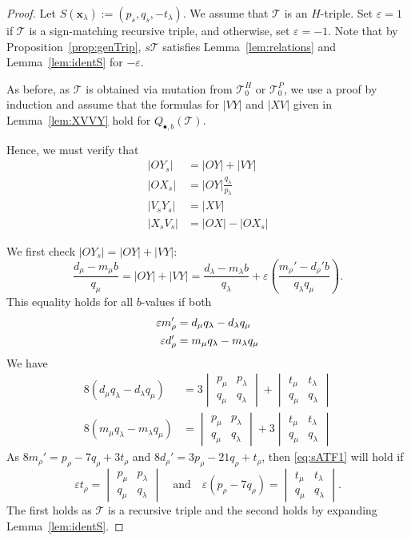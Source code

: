 \documentclass[11pt, reqno]{amsart}
\theoremstyle{remark}
\numberwithin{equation}{subsection}
\numberwithin{figure}{section}
\theoremstyle{customremark}
\newcommand{\Tt}{\mathcal{T}}
\newcommand{\la}{{\lambda}}
\newcommand{\eps}{\varepsilon}
\begin{document}
\begin{proof}
    Let $S(\bm{x}_\la):=(p_s,q_s,-t_\la).$
    We assume that $\Tt$ is an $H$-triple. 
Set $\eps=1$ if $\Tt$ is a sign-matching recursive triple, and  otherwise, set $\eps=-1.$ Note that by Proposition~\ref{prop:genTrip}, $s\Tt$ satisfies Lemma~\ref{lem:relations} and Lemma~\ref{lem:identS} for $-\eps.$

As before, as $\Tt$ is obtained via mutation from $\Tt_0^H$ or $\Tt_0^P$, we use a proof by induction and assume that the formulas for $|VY|$ and $|XV|$ given in Lemma~\ref{lem:XVVY} hold for $Q_{\bullet,b}(\Tt).$ 

Hence, we must verify that 
\begin{align*} 
      |OY_s|&=|OY|+|VY| \\
    |OX_s|&=|OY|\frac{q_\la}{p_\la} \\
     |V_sY_s|&=|XV| \\
     |X_sV_s|&=|OX|-|OX_s|
\end{align*}
    
    We first check $|OY_s|=|OY|+|VY|:$
    \[\frac{d_\mu-m_\mu b}{q_\mu}=|OY|+|VY|=\frac{d_\la-m_\la b}{q_\la}+\eps\left(\frac{m_\rho'-d_\rho' b}{q_\la q_\mu}\right).\] This equality holds for all $b$-values if 
    both 
     \begin{align} \label{eq:sATF1}
        \eps m_\rho'&=d_\mu q_\la-d_\la q_\mu  \notag \\
        \eps d_\rho'&=m_\mu q_\la-m_\la q_\mu
    \end{align}
    We have
    \begin{align*} 8(d_\mu q_\la -d_\la q_\mu)&= 3\begin{vmatrix}  p_\mu & p_\la \\ q_\mu & q_\la \end{vmatrix}+\begin{vmatrix} 
 t_\mu &  t_\la
\\ q_\mu & q_\la
    \end{vmatrix} \\
    8(m_\mu q_\la -m_\la q_\mu)&= \begin{vmatrix}  p_\mu & p_\la \\ q_\mu & q_\la \end{vmatrix}+3\begin{vmatrix} 
 t_\mu & t_\la
\\ q_\mu & q_\la
    \end{vmatrix}
    \end{align*}
    As $8m_\rho'=p_\rho-7q_\rho+3 t_\rho$ and 
    $8d_\rho'=3p_\rho-21q_\rho+ t_\rho$, 
    then \eqref{eq:sATF1} will hold if 
    \[ \eps t_\rho=\begin{vmatrix}  p_\mu & p_\la \\ q_\mu & q_\la \end{vmatrix} \quad \text{and} \quad 
    \eps(p_\rho-7q_\rho)=\begin{vmatrix} 
t_\mu & t_\la
\\ q_\mu & q_\la
    \end{vmatrix}. 
    \]
    The first holds as $\Tt$ is a recursive triple and the second holds by expanding Lemma~\ref{lem:identS}.


\end{proof}
\end{document}
